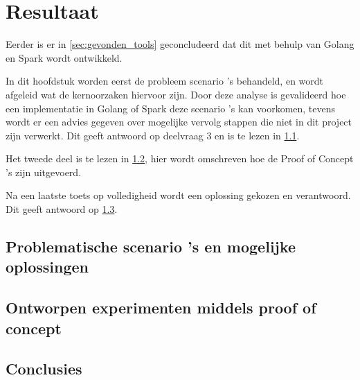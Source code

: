 \chapter{Resultaat}
\label{ch:resultaat}

Eerder is er in \ref{sec:gevonden_tools} geconcludeerd dat dit met behulp van Golang en Spark wordt ontwikkeld.

In dit hoofdstuk worden eerst de probleem scenario 's behandeld, en wordt afgeleid wat de kernoorzaken hiervoor zijn. Door deze analyse is gevalideerd hoe een implementatie in Golang of Spark deze scenario 's kan voorkomen, tevens wordt er een advies gegeven over mogelijke vervolg stappen die niet in dit project zijn verwerkt. Dit geeft antwoord op deelvraag 3 en is te lezen in \ref{sec:deelvraag3}.

Het tweede deel is te lezen in \ref{sec:deelvraag4}, hier wordt omschreven hoe de Proof of Concept ’s zijn uitgevoerd.

Na een laatste toets op volledigheid wordt een oplossing gekozen en verantwoord. Dit geeft antwoord op \ref{sec:deelvraag5}.
\clearpage

\section{Problematische scenario 's en mogelijke oplossingen}
\label{sec:deelvraag3}

\clearpage

\section{Ontworpen experimenten middels proof of concept}
\label{sec:deelvraag4}

\clearpage

\section{Conclusies}
\label{sec:deelvraag5}

